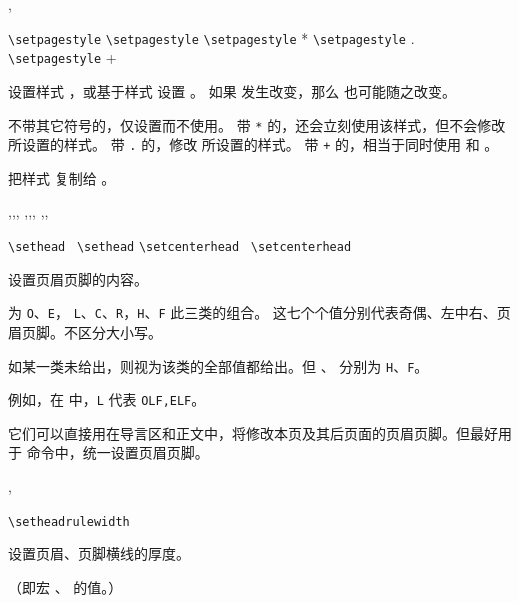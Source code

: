 \documentclass[twoside]{book}
\begin{document}
\begin{function}{\setpagestyle,\copypagestyle}
  \begin{syntax}
    \verb|\setpagestyle|    
    \verb|\setpagestyle|     
    \verb|\setpagestyle| *   
    \verb|\setpagestyle| .   
    \verb|\setpagestyle| +   
    \V\copypagestyle  {} 
  \end{syntax}
设置样式 ，或基于样式  设置 。
如果  发生改变，那么  也可能随之改变。

不带其它符号的，仅设置而不使用。
带 \verb|*| 的，还会立刻使用该样式，但不会修改  所设置的样式。
带 \verb|.| 的，修改  所设置的样式。
带 \verb|+| 的，相当于同时使用  和 。

 把样式  复制给 。
\end{function}

\begin{function}{\sethead,\setfoot,\setheadfoot,
  \setlefthead,\setcenterhead,\setrighthead,
  \setleftfoot,\setcenterfoot,\setrightfoot}
  \begin{syntax}
    \verb|\sethead|         \,
    \verb|\sethead|  
    \verb|\setcenterhead|           \,
    \verb|\setcenterhead|  
  \end{syntax}
设置页眉页脚的内容。

 为 \texttt{O}、\texttt{E}， \texttt{L}、\texttt{C}、\texttt{R}，\texttt{H}、\texttt{F} 此三类的组合。
这七个个值分别代表奇偶、左中右、页眉页脚。不区分大小写。

如某一类未给出，则视为该类的全部值都给出。但 、 分别为 \texttt{H}、\texttt{F}。

例如，在  中，\verb|L| 代表 \verb|OLF,ELF|。

它们可以直接用在导言区和正文中，将修改本页及其后页面的页眉页脚。但最好用于 
 命令中，统一设置页眉页脚。
\end{function}

\begin{function}{\setheadrulewidth,\setfootrulewidth}
  \begin{syntax}
    \verb|\setheadrulewidth| 
  \end{syntax}
设置页眉、页脚横线的厚度。

（即宏 、 的值。）
\end{function}
\end{document}
